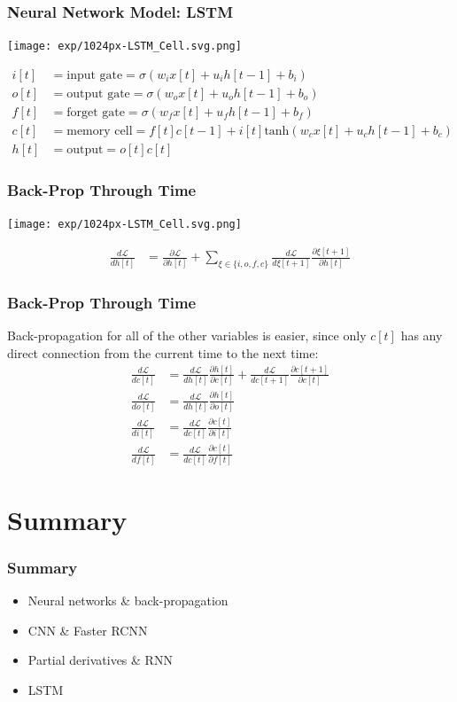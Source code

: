 \documentclass{beamer}
\begin{document}
\begin{frame}
  \frametitle{Neural Network Model: LSTM}
  \centerline{\texttt{[image: exp/1024px-LSTM\_Cell.svg.png]}}
  \begin{align*}
    i[t] &=\mbox{input gate}=\sigma(w_i x[t]+u_i h[t-1]+b_i)\\
    o[t] &=\mbox{output gate}=\sigma(w_o x[t]+u_o h[t-1]+b_o)\\
    f[t] &=\mbox{forget gate}=\sigma(w_f x[t]+u_f h[t-1]+b_f)\\
    c[t] &=\mbox{memory cell}=f[t]c[t-1]+i[t]\mbox{tanh}\left(w_cx[t]+u_ch[t-1]+b_c\right)\\
    h[t] &=\mbox{output}=o[t]c[t]
  \end{align*}
\end{frame}

\begin{frame}
  \frametitle{Back-Prop Through Time}

  \centerline{\texttt{[image: exp/1024px-LSTM\_Cell.svg.png]}}

  \begin{align*}
    \frac{d{\mathcal L}}{d h[t]}
    &= \frac{\partial{\mathcal L}}{\partial h[t]} +
    \sum_{\xi\in\{i,o,f,c\}}\frac{d{\mathcal L}}{d\xi[t+1]}
    \frac{\partial\xi[t+1]}{\partial h[t]}
  \end{align*}
\end{frame}

\begin{frame}
  \frametitle{Back-Prop Through Time}

  Back-propagation for all of the other variables is easier, since
  only $c[t]$ has any direct connection from the current time to the
  next time:
  \begin{align*}
    \frac{d{\mathcal L}}{dc[t]}
    &=\frac{d{\mathcal L}}{dh[t]}\frac{\partial h[t]}{\partial c[t]}+
    \frac{d{\mathcal L}}{dc[t+1]}\frac{\partial c[t+1]}{\partial c[t]}\\
    \frac{d{\mathcal L}}{do[t]}&=
    \frac{d{\mathcal L}}{dh[t]}\frac{\partial h[t]}{\partial o[t]}\\
    \frac{d{\mathcal L}}{di[t]}&=
    \frac{d{\mathcal L}}{dc[t]}\frac{\partial c[t]}{\partial i[t]}\\
    \frac{d{\mathcal L}}{df[t]}&=
    \frac{d{\mathcal L}}{dc[t]}\frac{\partial c[t]}{\partial f[t]}
  \end{align*}
\end{frame}

\section{Summary}
\setcounter{subsection}{1}

\begin{frame}
  \frametitle{Summary}

  \begin{itemize}
  \item Neural networks \& back-propagation
  \item CNN \& Faster RCNN
  \item Partial derivatives \& RNN
  \item LSTM
  \end{itemize}
\end{frame}
\end{document}
